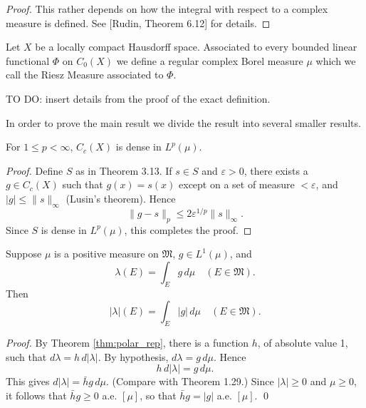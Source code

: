 \begin{proof}
  This rather depends on how the integral with respect to a complex measure is defined.
  See [Rudin, Theorem 6.12] for details.
\end{proof}


\begin{definition}
  \label{def:riesz_measure}
  \notready
  Let $X$ be a locally compact Hausdorff space.
  Associated to every bounded linear functional $\Phi$ on $C_0(X)$ we define a regular complex Borel measure $\mu$ which we call the Riesz Measure associated to $\Phi$.

  TO DO: insert details from the proof of the exact definition.
\end{definition}

In order to prove the main result we divide the result into several smaller results.


\begin{theorem}[Rudin 3.14]
  \label{thm:Cc_dense_Lp}
  For $1 \leq p < \infty$, $C_c(X)$ is dense in $L^p(\mu)$.
\end{theorem}

\begin{proof}
  Define $S$ as in Theorem 3.13. If $s \in S$ and $\varepsilon > 0$, there exists a $g \in C_c(X)$ such that $g(x) = s(x)$ except on a set of measure $< \varepsilon$, and $|g| \leq \|s\|_\infty$ (Lusin's theorem).
  Hence
  \begin{equation}
    \|g - s\|_p \leq 2\varepsilon^{1/p}\|s\|_\infty.
  \end{equation}
  Since $S$ is dense in $L^p(\mu)$, this completes the proof.
\end{proof}

\begin{theorem}[Rudin 6.13]
  \label{thm:abs_integral}
  Suppose $\mu$ is a positive measure on $\mathfrak{M}$, $g \in L^1(\mu)$, and
  \begin{equation}
    \lambda(E) = \int_E g \, d\mu \quad (E \in \mathfrak{M}).
  \end{equation}
  Then
  \begin{equation}
    |\lambda|(E) = \int_E |g| \, d\mu \quad (E \in \mathfrak{M}).
  \end{equation}
\end{theorem}

\begin{proof}
  By Theorem \ref{thm:polar_rep}, there is a function $h$, of absolute value 1, such that $d\lambda = h \, d|\lambda|$. By hypothesis, $d\lambda = g \, d\mu$. Hence
  \[
    h \, d|\lambda| = g \, d\mu.
  \]
  This gives $d|\lambda| = \bar{h}g \, d\mu$. (Compare with Theorem 1.29.)
  Since $|\lambda| \geq 0$ and $\mu \geq 0$, it follows that $\bar{h}g \geq 0$ a.e. $[\mu]$, so that $\bar{h}g = |g|$ a.e. $[\mu]$. \qed
\end{proof}

